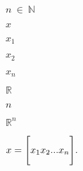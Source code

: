 \documentclass[UTF8]{ctexart}
\begin{document}
$n\ \in\ \mathbb{N}$

$x$

$x_1$


$x_2$

$x_n$


$\mathbb{R}$

$n$

$\mathbb{R}^n$

$
x = \Bigg[ x_1 \\x_2 ... x_n \Bigg].
$
\end{document}
